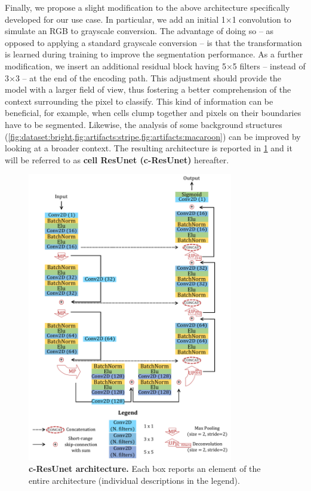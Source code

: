 Finally, we propose a slight modification to the above architecture specifically developed for our use case.
In particular, we add an initial 1$\times$1 convolution to simulate an RGB to grayscale conversion.
The advantage of doing so -- as opposed to applying a standard grayscale conversion -- is that the transformation is learned during training to improve the segmentation performance.
As a further modification, we insert an additional residual block having 5$\times$5 filters -- instead of 3$\times$3 -- at the end of the encoding path. 
This adjustment should provide the model with a larger field of view, thus fostering a better comprehension of the context surrounding the pixel to classify.
This kind of information can be beneficial, for example, when cells clump together and pixels on their boundaries have to be segmented. 
Likewise, the analysis of some background structures (\cref{fig:dataset:bright,fig:artifacts:stripe,fig:artifacts:macaroon}) can be improved by looking at a broader context.
The resulting architecture is reported in \cref{fig:cresunet_architecture} and it will be referred to as \textbf{cell ResUnet (c-ResUnet)} hereafter.

\newpage
\begin{figure}
\centerline{
\includegraphics[width=0.8\textwidth]{figures/130_methods/c-resunet_architecture.pdf}
}
\caption{\textbf{c-ResUnet architecture.} Each box reports an element of the entire architecture (individual descriptions in the legend). 
} \label{fig:cresunet_architecture}
\end{figure}